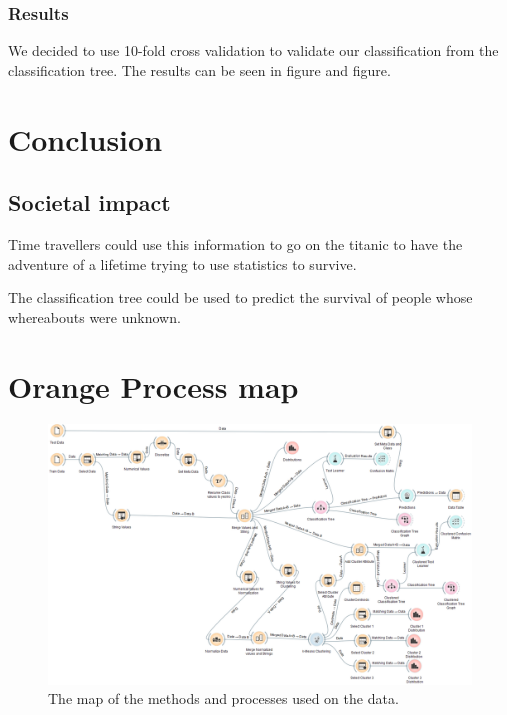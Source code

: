 \documentclass[a4paper,11pt]{article}
\begin{document}
\subsubsection{Results}
We decided to use 10-fold cross validation to validate our classification from the classification tree. The results can be seen in figure and figure.
\clearpage
\section{Conclusion}
\subsection{Societal impact}
Time travellers could use this information to go on the titanic to have the adventure of a lifetime trying to use statistics to survive.

The classification tree could be used to predict the survival of people whose whereabouts were unknown.

\clearpage
\appendix
\section{Orange Process map}
\begin{figure}[h]
	\centering
	\includegraphics[scale=0.35]{orangeMap}
	\caption{The map of the methods and processes used on the data.}
	\label{OrangeMap}
\end{figure}
\end{document}
